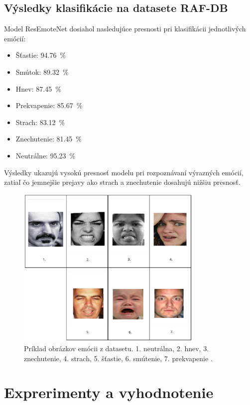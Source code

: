 \subsection{Výsledky klasifikácie na datasete RAF-DB}
Model ResEmoteNet dosiahol nasledujúce presnosti pri klasifikácii jednotlivých emócií:
\begin{itemize}
    \item Šťastie: 94.76~\%
    \item Smútok: 89.32~\%
    \item Hnev: 87.45~\%
    \item Prekvapenie: 85.67~\%
    \item Strach: 83.12~\%
    \item Znechutenie: 81.45~\%
    \item Neutrálne: 95.23~\%
\end{itemize}

Výsledky ukazujú vysokú presnosť modelu pri rozpoznávaní výrazných emócií, zatiaľ čo jemnejšie prejavy ako strach a znechutenie dosahujú nižšiu presnosť.

\begin{figure}[!htpb]
    \centering
    \includegraphics[width=0.8\textwidth]{img/emotions_dataset.png}
    \caption{Príklad obrázkov emócii z datasetu. 1. neutrálna, 2. hnev, 3. znechutenie, 4. strach, 5. šťastie, 6. smútenie, 7. prekvapenie \cite{li2017reliable}.} 
\end{figure}


\section{Exprerimenty a vyhodnotenie}
\label{sec:experiments}
